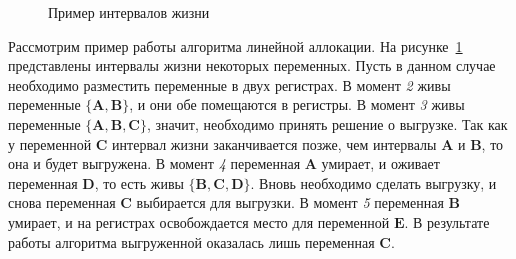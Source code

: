 \begin{example}
    \begin{figure}
        \centering
        \caption{Пример интервалов жизни}
        \label{fig:live_interval_example}
    \end{figure}

    Рассмотрим пример работы алгоритма линейной аллокации.
    На рисунке~\ref{fig:live_interval_example} представлены интервалы жизни
    некоторых переменных.
    Пусть в данном случае необходимо разместить переменные в двух регистрах.
    В момент \textit{2} живы переменные $\{\textbf{A}, \textbf{B}\}$, и они обе помещаются в регистры.
    В момент \textit{3} живы переменные $\{\textbf{A}, \textbf{B}, \textbf{C}\}$, значит, необходимо принять решение о выгрузке.
    Так как у переменной $\textbf{C}$ интервал жизни заканчивается позже, чем интервалы $\textbf{A}$ и $\textbf{B}$, то она и будет
    выгружена.
    В момент \textit{4} переменная $\textbf{A}$ умирает, и оживает переменная $\textbf{D}$, то есть живы $\{\textbf{B}, \textbf{C}, \textbf{D}\}$.
    Вновь необходимо сделать выгрузку, и снова переменная $\textbf{C}$ выбирается для выгрузки.
    В момент \textit{5} переменная $\textbf{B}$ умирает, и на регистрах освобождается место для переменной $\textbf{E}$.
    В результате работы алгоритма выгруженной оказалась лишь переменная $\textbf{C}$.
    

\end{example}
